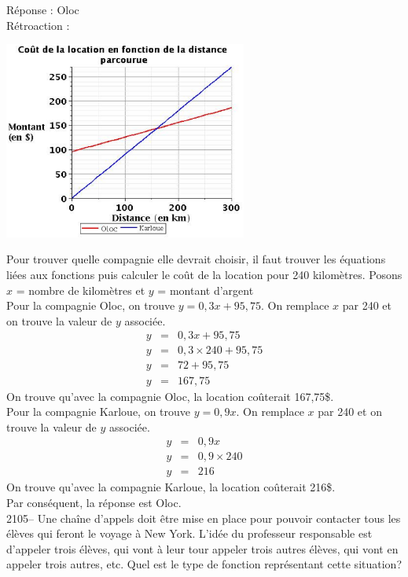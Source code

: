 \documentclass[letterpaper, 12pt]{article}
\begin{document}
R\'eponse : Oloc\\

R\'etroaction :\\
\begin{center}
 \includegraphics[width=8cm,bb=14 14 505 415]{Q2104a.eps}
\end{center}
Pour trouver quelle compagnie elle devrait choisir, il faut trouver les \'equations li\'ees aux fonctions puis calculer le co\^ut de la location pour 240 kilom\`etres. Posons $x$ = nombre de kilom\`etres et $y$ = montant d'argent\\

Pour la compagnie Oloc, on trouve $y=0,3x+95,75$. On remplace $x$ par 240 et on trouve la valeur de $y$ associ\'ee.
\begin{eqnarray*}
 y&=&0,3x+95,75\\
 y&=&0,3 \times 240+95,75\\
y&=&72+95,75\\
y&=&167,75
\end{eqnarray*}
On trouve qu'avec la compagnie Oloc, la location co\^uterait 167,75\$.\\

Pour la compagnie Karloue, on trouve $ y=0,9x$. On remplace $x$ par 240 et on trouve la valeur de $y$ associ\'ee.
\begin{eqnarray*}
 y&=&0,9x\\
 y&=&0,9\times240 \\
 y&=&216
\end{eqnarray*}
On trouve qu'avec la compagnie Karloue, la location co\^uterait 216\$.\\
Par cons\'equent, la r\'eponse est Oloc.\\

2105-- Une cha\^ine d'appels doit \^etre mise en place pour pouvoir contacter tous les \'el\`eves qui feront le voyage \`a New York. L'id\'ee du professeur responsable est d'appeler trois \'el\`eves, qui vont \`a leur tour appeler trois autres \'el\`eves, qui vont en appeler trois autres, etc. Quel est le type de fonction repr\'esentant cette situation?  \\
\end{document}
